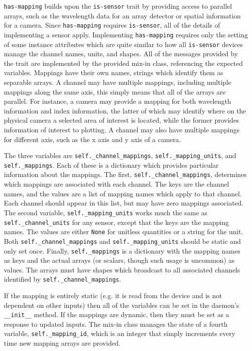 \texttt{has-mapping} builds upon the \texttt{is-sensor} trait by providing access to parallel arrays, such as the wavelength data for an array detector or spatial information for a camera.
Since \texttt{has-mapping} requires \texttt{is-sensor}, all of the details of implementing a sensor apply.
Implementing \texttt{has-mapping} requires only the setting of some instance attributes which are quite similar to how all \texttt{is-sensor} devices manage the channel names, units, and shapes.
All of the messages provided by the trait are implemented by the provided mix-in class, referencing the expected variables.
Mappings have their own names, strings which identify them as separable arrays.
A channel may have multiple mappings, including multiple mappings along the same axis, this simply means that all of the arrays are parallel.
For instance, a camera may provide a mapping for both wavelength information and index information, the latter of which may identify where on the physical camera a selected area of interest is located, while the former provides information of interest to plotting.
A channel may also have multiple mappings for different axis, such as the x axis and y axis of a camera.

The three variables are \texttt{self.\_channel\_mappings}, \texttt{self.\_mapping\_units}, and \texttt{self.\_mappings}.
Each of these is a dictionary which provides particular information about the mappings.
The first, \texttt{self.\_channel\_mappings}, determines which mappings are associated with each channel.
The keys are the channel names, and the values are a list of mapping names which apply to that channel.
Each channel should appear in this list, but may have zero mappings associated.
The second variable, \texttt{self.\_mapping\_units} works much the same as \texttt{self.\_channel\_units} for any sensor, except that the keys are the mapping names.
The values are either \texttt{None} for unitless quantities or a string for the unit.
Both \texttt{self.\_channel\_mappings} and \texttt{self.\_mapping\_units} should be static and only set once.
Finally, \texttt{self.\_mappings} is a dictionary with the mapping names as keys and the actual arrays (or scalars, though such usage is uncommon) as values.
The arrays must have shapes which broadcast to all associated channels identified by \texttt{self.\_channel\_mappings}.

If the mapping is entirely static (e.g. it is read from the device and is not dependent on other inputs) then all of the variables can be set in the daemon's \texttt{\_\_init\_\_} method.
If the mappings are dynamic, then they must be set as a response to updated inputs.
The mix-in class manages the state of a fourth variable, \texttt{self.\_mapping\_id}, which is an integer that simply increments every time new mapping arrays are provided.


